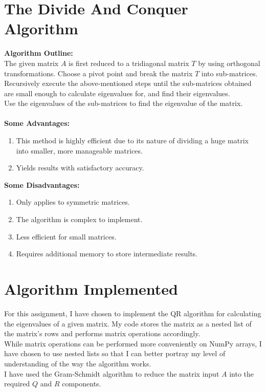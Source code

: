 \documentclass[journal,12pt,twocolumn]{IEEEtran}
\theoremstyle{remark}
\begin{document}
\section{The Divide And Conquer Algorithm}
\textbf{Algorithm Outline:}
\\
The given matrix $A$ is first reduced to a tridiagonal matrix $T$ by using orthogonal transformations. Choose a pivot point and break the matrix $T$ into sub-matrices. \\
Recursively execute the above-mentioned steps until the sub-matrices obtained are small enough to calculate eigenvalues for, and find their eigenvalues. \\
Use the eigenvalues of the sub-matrices to find the eigenvalue of the matrix.
\\ \\
\textbf{Some Advantages:}
\begin{enumerate}
\item This method is highly efficient due to its nature of dividing a huge matrix into smaller, more manageable matrices.
\item Yields results with satisfactory accuracy.
\end{enumerate}
\textbf{Some Disadvantages:}
\begin{enumerate}
\item Only applies to symmetric matrices.
\item The algorithm is complex to implement.
\item Less efficient for small matrices.
\item Requires additional memory to store intermediate results.
\end{enumerate}

\newpage

\section*{Algorithm Implemented}
For this assignment, I have chosen to implement the QR algorithm for calculating the eigenvalues of a given matrix. My code stores the matrix as a nested list of the matrix's rows and performs matrix operations accordingly. \\
While matrix operations can be performed more conveniently on NumPy arrays, I have chosen to use nested lists so that I can better portray my level of understanding of the way the algorithm works. \\
I have used the Gram-Schmidt algorithm to reduce the matrix input $A$ into the required $Q$ and $R$ components.
\end{document}
